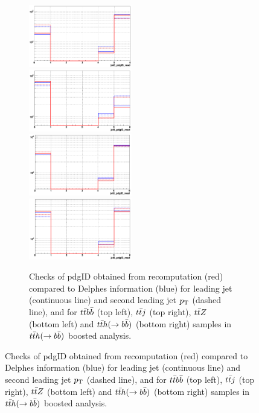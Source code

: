 \documentclass{cernrep}
\begin{document}
\begin{figure}[!htb]
\begin{figure}[!htb]\centering
\includegraphics[width=0.495\textwidth]{Fig/check_TRF/tth_boosted/jet12pdgID_ttbb_redModule_blueDELPHES.png}
\includegraphics[width=0.495\textwidth]{Fig/check_TRF/tth_boosted/jet12pdgID_ttj_redModule_blueDELPHES.png}
\includegraphics[width=0.495\textwidth]{Fig/check_TRF/tth_boosted/jet12pdgID_ttz_redModule_blueDELPHES.png}
\includegraphics[width=0.495\textwidth]{Fig/check_TRF/tth_boosted/jet12pdgID_tth_redModule_blueDELPHES.png}
\caption{Checks of pdgID obtained from recomputation (red) compared to Delphes information (blue) for leading jet (continuous line) and second leading jet $p\sb{\scriptstyle\mathrm{T}}$ (dashed line), and for $t\bar{t}b\bar{b}$ (top left), $t\bar{t}j$ (top right), $t\bar{t}Z$ (bottom left) and $t\bar{t}h(\rightarrow b\bar{b})$ (bottom right) samples in $t\bar{t}h(\rightarrow b\bar{b})$ boosted analysis.}
\label{fig:tthboosted_TRFchecks1}
\end{figure}


\end{figure}
\end{document}
